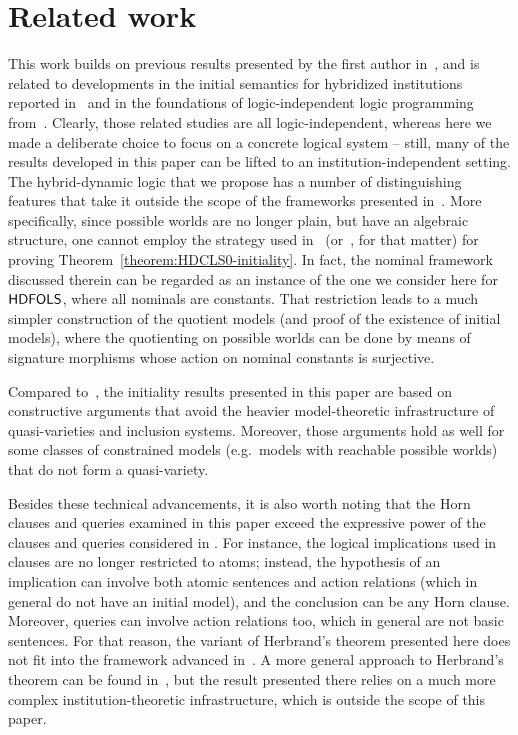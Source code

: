 \documentclass[a4paper,UKenglish,cleveref,autoref]{lipics-v2019}
\begin{document}

\section{Related work}
\label{section:related-work}

This work builds on previous results presented by the first author in~\cite{Gaina17Her}, and is related to developments in the initial semantics for hybridized institutions reported in~\cite{Diaconescu16} and in the foundations of logic-independent logic programming from~\cite{Diaconescu04,TutuF15,TutuF17}.
Clearly, those related studies are all logic-independent, whereas here we made a deliberate choice to focus on a concrete logical system -- still, many of the results developed in this paper can be lifted to an institution-independent setting.
The hybrid-dynamic logic that we propose has a number of distinguishing features that take it outside the scope of the frameworks presented in~\cite{Gaina17Her,Diaconescu16,Diaconescu04}.
More specifically, since possible worlds are no longer plain, but have an algebraic structure, one cannot employ the strategy used in~\cite{Gaina17Her} (or~\cite{Diaconescu16}, for that matter) for proving Theorem~\ref{theorem:HDCLS0-initiality}.
In fact, the nominal framework discussed therein can be regarded as an instance of the one we consider here for ${\mathsf{HDFOLS}}$, where all nominals are constants.
That restriction leads to a much simpler construction of the quotient models (and proof of the existence of initial models), where the quotienting on possible worlds can be done by means of signature morphisms whose action on nominal constants is surjective.

Compared to~\cite{Diaconescu16}, the initiality results presented in this paper are based on constructive arguments that avoid the heavier model-theoretic infrastructure of quasi-varieties and inclusion systems.
Moreover, those arguments hold as well for some classes of constrained models (e.g.\ models with reachable possible worlds) that do not form a quasi-variety.

Besides these technical advancements, it is also worth noting that the Horn clauses and queries examined in this paper exceed the expressive power of the clauses and queries considered in \cite{Gaina17Her}.
For instance, the logical implications used in clauses are no longer restricted to atoms; instead, the hypothesis of an implication can involve both atomic sentences and action relations (which in general do not have an initial model), and the conclusion can be any Horn clause.
Moreover, queries can involve action relations too, which in general are not basic sentences.
For that reason, the variant of Herbrand's theorem presented here does not fit into the framework advanced in~\cite{Diaconescu04}.
A more general approach to Herbrand's theorem can be found in~\cite{TutuF17}, but the result presented there relies on a much more complex institution-theoretic infrastructure, which is outside the scope of this paper.
\end{document}
